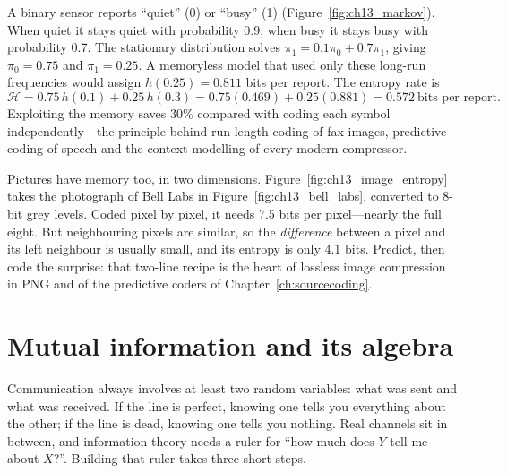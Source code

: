\begin{worked}
A binary sensor reports ``quiet'' (0) or ``busy'' (1) (Figure~\ref{fig:ch13_markov}). When quiet it
stays quiet with probability 0.9; when busy it stays busy with probability 0.7. The stationary
distribution solves $\pi_1=0.1\pi_0+0.7\pi_1$, giving $\pi_0=0.75$ and $\pi_1=0.25$. A memoryless
model that used only these long-run frequencies would assign $h(0.25)=0.811$ bits per report. The
entropy rate is
\[
\mathcal{H}=0.75\,h(0.1)+0.25\,h(0.3)=0.75(0.469)+0.25(0.881)=0.572\ \text{bits per report}.
\]
Exploiting the memory saves 30\% compared with coding each symbol independently---the principle
behind run-length coding of fax images, predictive coding of speech and the context modelling of
every modern compressor.
\end{worked}

Pictures have memory too, in two dimensions. Figure~\ref{fig:ch13_image_entropy} takes the
photograph of Bell Labs in Figure~\ref{fig:ch13_bell_labs}, converted to 8-bit grey levels. Coded
pixel by pixel, it needs 7.5 bits per pixel---nearly the full eight. But neighbouring pixels are
similar, so the \emph{difference} between a pixel and its left neighbour is usually small, and its
entropy is only 4.1 bits. Predict, then code the surprise: that two-line recipe is the heart of lossless image
compression in PNG and of the predictive coders of Chapter~\ref{ch:sourcecoding}.


\section{Mutual information and its algebra}
\label{sec:ch13:mi}

Communication always involves at least two random variables: what was sent and what was received.
If the line is perfect, knowing one tells you everything about the other; if the line is dead,
knowing one tells you nothing. Real channels sit in between, and information theory needs a ruler
for ``how much does $Y$ tell me about $X$?''. Building that ruler takes three short steps.

